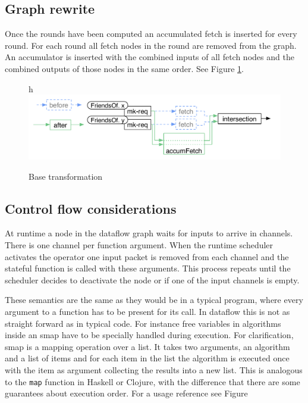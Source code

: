 \subsection{Graph rewrite}

Once the rounds have been computed an accumulated fetch is inserted for every round.
For each round all fetch nodes in the round are removed from the graph.
An accumulator is inserted with the combined inputs of all fetch nodes and the combined outputs of those nodes in the same order. See Figure \ref{fig:yauhau-transformation}.

\begin{figure}{h}
    \includegraphics[width=\textwidth]{Figures/yauhau-transformation}
	\caption{Base transformation\cite{ErtelGoensAdamEtAl2016}}
	\label{fig:yauhau-transformation}
\end{figure}

\subsection{Control flow considerations}

At runtime a node in the dataflow graph waits for inputs to arrive in channels.
There is one channel per function argument.
When the runtime scheduler activates the operator one input packet is removed from each channel and the stateful function is called with these arguments.
This process repeats until the scheduler decides to deactivate the node or if one of the input channels is empty.

These semantics are the same as they would be in a typical program, where every argument to a function has to be present for its call.
In dataflow this is not as straight forward as in typical code.
For instance free variables in algorithms inside an smap have to be specially handled during execution.
For clarification, smap is a mapping operation over a list.
It takes two arguments, an algorithm and a list of items and for each item in the list the algorithm is executed once with the item as argument collecting the results into a new list.
This is analogous to the \texttt{map} function in Haskell or Clojure, with the difference that there are some guarantees about execution order.
For a usage reference see Figure

